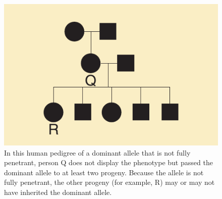 \documentclass[11pt,ignorenonframetext,aspectratio=169]{beamer}
\begin{document}
\begin{frame}{}
\protect\hypertarget{section-2}{}
\begin{figure}

{\centering \includegraphics[width=0.6\linewidth]{./images/incomplete_penetrance} 

}

\caption{In this human pedigree of a dominant allele that is not fully penetrant, person Q does not display the phenotype but passed the dominant allele to at least two progeny. Because the allele is not fully penetrant, the other progeny (for example, R) may or may not have inherited the dominant allele.}\label{fig:penetrance}
\end{figure}
\end{frame}
\end{document}
